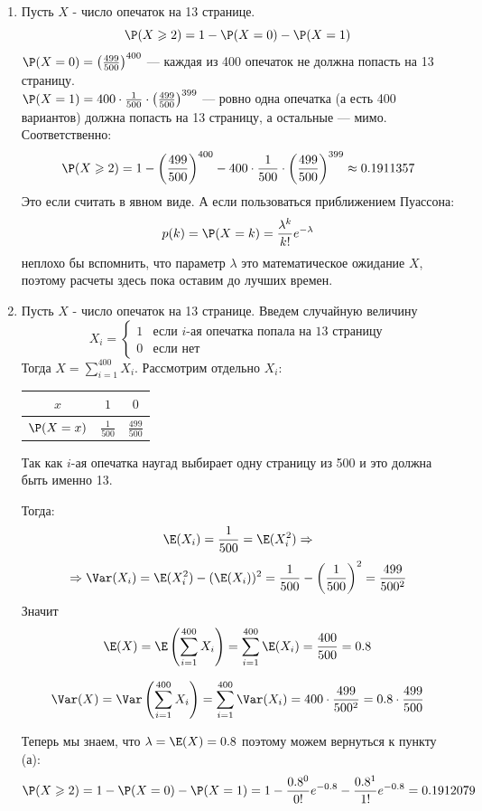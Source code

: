 \begin{enumerate}
\begin{enumerate}
\item Пусть $X$ - число опечаток на 13 странице. \[\P(X \geqslant 2) = 1 - \P(X=0) - \P(X=1) \]
$\P(X=0) = \left( \frac{499}{500} \right)^{400}$ — каждая из 400 опечаток не должна попасть на 13 страницу.\\
$\P(X=1) = 400\cdot\frac{1}{500}\cdot\left( \frac{499}{500} \right)^{399}$ — ровно одна опечатка (а есть 400 вариантов) должна попасть на 13 страницу, а остальные — мимо. Соответственно:
\[
\P(X \geqslant 2) = 1 - \left( \frac{499}{500} \right)^{400} - 400\cdot\frac{1}{500}\cdot\left( \frac{499}{500} \right)^{399} \approx 0.1911357
\]
Это если считать в явном виде. А если пользоваться приближением Пуассона:
\[
p(k) = \P(X = k) = \frac{\lambda^k}{k!}e^{-\lambda}
\]
неплохо бы вспомнить, что параметр $\lambda$ это математическое ожидание $X$, поэтому расчеты здесь пока оставим до лучших времен.

\item Пусть $X$ - число опечаток на 13 странице. Введем случайную величину
\[X_i =
\begin{cases}
1 & \text{если } i\text{-ая опечатка попала на 13 страницу}\\
0 & \text{если нет}
\end{cases}
\]
Тогда $X = \sum\limits_{i=1}^{400}X_i$. Рассмотрим отдельно $X_i$:

\begin{tabular}{@{}ccc@{}}
\toprule
$x$         & $1$             & $0$               \\ \midrule
$\P(X=x)$ & $\frac{1}{500}$ & $\frac{499}{500}$ \\ \bottomrule
\end{tabular}

Так как $i$-ая опечатка наугад выбирает одну страницу из 500 и это должна быть именно 13.

Тогда:
\[
\E(X_i) = \frac{1}{500} = \E(X^2_i) \Rightarrow
\]
\[
\Rightarrow \Var(X_i) = \E(X^2_i) - (\E(X_i))^2 = \frac{1}{500} - \left(\frac{1}{500}\right)^2 = \frac{499}{500^2}
\]
Значит
\[
\E(X) = \E\left(\sum\limits_{i=1}^{400}X_i\right) = \sum\limits_{i=1}^{400}\E(X_i)  = \frac{400}{500} = 0.8
\]

\[
\Var(X) = \Var\left(\sum\limits_{i=1}^{400}X_i\right) = \sum\limits_{i=1}^{400}\Var(X_i) = 400\cdot\frac{499}{500^2} = 0.8\cdot\frac{499}{500}
\]

Теперь мы знаем, что $\lambda = \E(X) = 0.8$ поэтому можем вернуться к пункту (а):
\[
\P(X \geqslant 2) = 1 - \P(X=0) - \P(X=1)  = 1 - \frac{0.8^0}{0!}e^{-0.8} - \frac{0.8^1}{1!}e^{-0.8} = 0.1912079
\] \vspace{-1.2cm}


\end{enumerate}
\end{enumerate}
